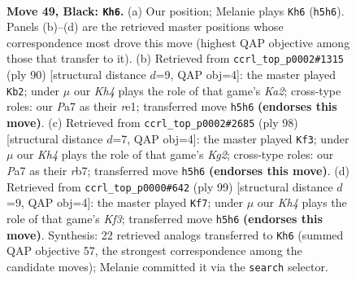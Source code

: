 \documentclass[11pt]{article}
\begin{document}
\clearpage

\begin{figure}[p]\centering
\begin{subfigure}{0.46\textwidth}\centering
\resizebox{\linewidth}{!}{%
\newchessgame
\chessboard[
  setfen={8/p2p4/2p5/4KP1k/8/3r4/8/8 b - - 0 49},
  showmover=false,
  pgfstyle=straightmove, color=movearrow, markmove={h5-h6}
]}
\caption{}
\end{subfigure}\hfill
\begin{subfigure}{0.46\textwidth}\centering
\resizebox{\linewidth}{!}{%
\newchessgame
\chessboard[
  setfen={8/2R5/8/1k6/1p6/1P6/K1P5/4r3 w - - 9 46},
  showmover=false,
  pgfstyle=straightmove, color=movearrow, markmove={a2-b2}
]}
\caption{}
\end{subfigure}
\\[4pt]
\begin{subfigure}{0.46\textwidth}\centering
\resizebox{\linewidth}{!}{%
\newchessgame
\chessboard[
  setfen={8/1r6/7k/7p/7P/2R3P1/6K1/8 w - - 15 50},
  showmover=false,
  pgfstyle=straightmove, color=movearrow, markmove={g2-f3}
]}
\caption{}
\end{subfigure}\hfill
\begin{subfigure}{0.46\textwidth}\centering
\resizebox{\linewidth}{!}{%
\newchessgame
\chessboard[
  setfen={8/8/5k2/5p1P/6p1/6P1/7K/8 b - - 1 50},
  showmover=false,
  pgfstyle=straightmove, color=movearrow, markmove={f6-f7}
]}
\caption{}
\end{subfigure}
\caption{\textbf{Move 49, Black: \texttt{Kh6}.} (a) Our position; Melanie plays \texttt{Kh6} (\texttt{h5h6}). Panels (b)--(d) are the retrieved master positions whose correspondence most drove this move (highest QAP objective among those that transfer to it). (b) Retrieved from \texttt{ccrl\_top\_p0002\#1315} (ply 90) [structural distance $d$=9, QAP obj=4]: the master played \texttt{Kb2}; under $\mu$ our \emph{Kh4} plays the role of that game's \emph{Ka2}; cross-type roles: our \emph{P}a7 as their \emph{r}e1; transferred move \texttt{h5h6} \textbf{(endorses this move)}. (c) Retrieved from \texttt{ccrl\_top\_p0002\#2685} (ply 98) [structural distance $d$=7, QAP obj=4]: the master played \texttt{Kf3}; under $\mu$ our \emph{Kh4} plays the role of that game's \emph{Kg2}; cross-type roles: our \emph{P}a7 as their \emph{r}b7; transferred move \texttt{h5h6} \textbf{(endorses this move)}. (d) Retrieved from \texttt{ccrl\_top\_p0000\#642} (ply 99) [structural distance $d$=9, QAP obj=4]: the master played \texttt{Kf7}; under $\mu$ our \emph{Kh4} plays the role of that game's \emph{Kf3}; transferred move \texttt{h5h6} \textbf{(endorses this move)}. Synthesis: 22 retrieved analogs transferred to \texttt{Kh6} (summed QAP objective 57, the strongest correspondence among the candidate moves); Melanie committed it via the \texttt{search} selector.}
\label{fig:thought-m97}
\end{figure}
\end{document}
